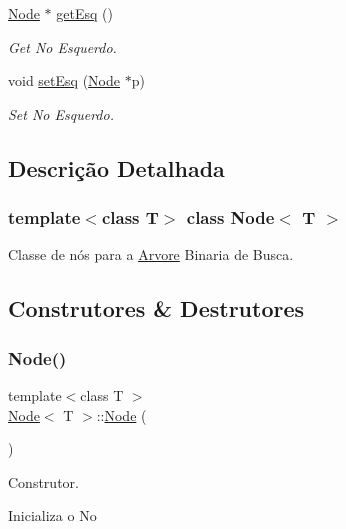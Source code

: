 \begin{DoxyCompactItemize}
\hyperlink{classNode}{Node} $\ast$ \hyperlink{classNode_a95b729016f4e073d9b17d1d35760e464}{get\+Esq} ()
\begin{DoxyCompactList}\small\item\em Get No Esquerdo. \end{DoxyCompactList}\item 
void \hyperlink{classNode_a3022486378d18a2d63d78850668282e3}{set\+Esq} (\hyperlink{classNode}{Node} $\ast$p)
\begin{DoxyCompactList}\small\item\em Set No Esquerdo. \end{DoxyCompactList}\end{DoxyCompactItemize}


\subsection{Descrição Detalhada}
\subsubsection*{template$<$class T$>$\newline
class Node$<$ T $>$}

Classe de nós para a \hyperlink{classArvore}{Arvore} Binaria de Busca. 

\subsection{Construtores \& Destrutores}
\mbox{\label{classNode_a0ac1d44cfe588be564acf25485029bd8}} 
\subsubsection{\texorpdfstring{Node()}{Node()}\hspace{0.1cm}{\footnotesize\ttfamily [1/2]}}
{\footnotesize\ttfamily template$<$class T $>$ \\
\hyperlink{classNode}{Node}$<$ T $>$\+::\hyperlink{classNode}{Node} (\begin{DoxyParamCaption}{ }\end{DoxyParamCaption})}



Construtor. 

Inicializa o No \mbox{\label{classNode_a1ed405745e0be93ff2ef2616405bfdc2}} 
